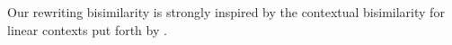 Our rewriting bisimilarity is strongly inspired by the contextual bisimilarity for linear contexts put forth by \textcite{Deng+:MSCS16}.








